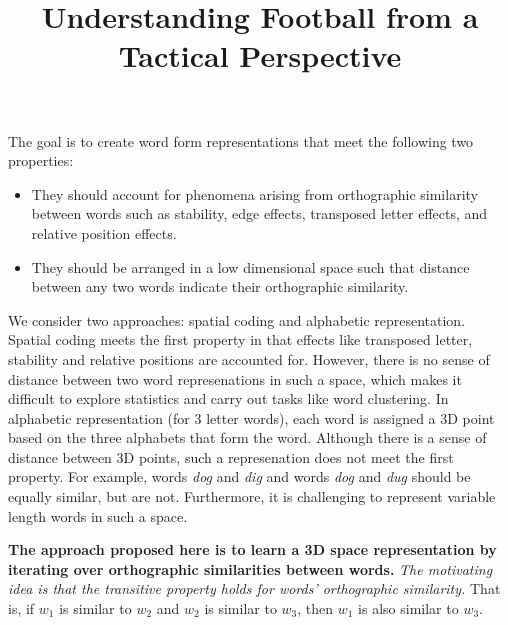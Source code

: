 \documentclass[a4paper, 11pt, oneside]{Thesis}  %
\begin{document}
\title  {Understanding Football from a Tactical Perspective}


\mainmatter	  %
\pagestyle{fancy}  %



The goal is to create word form representations that meet the following two properties:

\begin{itemize}
\item They should account for phenomena arising from orthographic similarity between words such as stability, edge effects, transposed letter effects, and relative position effects.
\item They should be arranged in a low dimensional space such that distance between any two words indicate their orthographic similarity.
\end{itemize}

We consider two approaches: spatial coding and alphabetic representation. Spatial coding meets the first property in that effects like transposed letter, stability and relative positions are accounted for. However, there is no sense of distance between two word represenations in such a space, which makes it difficult to explore statistics and carry out tasks like word clustering. In alphabetic representation (for 3 letter words), each word is assigned a 3D point based on the three alphabets that form the word. Although there is a sense of distance between 3D points, such a represenation does not meet the first property. For example, words \textit{dog} and \textit{dig} and words \textit{dog} and \textit{dug} should be equally similar, but are not. Furthermore, it is challenging to represent variable length words in such a space. 

\textbf{The approach proposed here is to learn a 3D space representation by iterating over orthographic similarities between words.} \textit{The motivating idea is that the transitive property holds for words' orthographic similarity.} That is, if \(w_1\) is similar to \(w_2\) and \(w_2\) is similar to \(w_3\), then \(w_1\) is also similar to \(w_3\).
\end{document}
